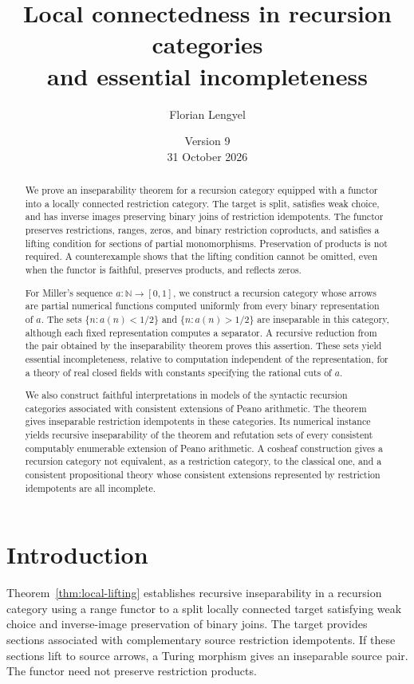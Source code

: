 \documentclass[11pt]{article}
\title{Local connectedness in recursion categories\\
and essential incompleteness}
\author{Florian Lengyel}
\date{Version 9\\31 October 2026}
\newcommand{\N}{\mathbb N}
\begin{document}
\maketitle

\begin{abstract}
We prove an inseparability theorem for a recursion category equipped
with a functor into a locally connected restriction category.
The target is split, satisfies weak choice, and has inverse images
preserving binary joins of restriction idempotents. The functor
preserves restrictions, ranges, zeros, and binary restriction coproducts,
and satisfies a lifting condition for sections of partial monomorphisms.
Preservation of products is not required. A counterexample shows that
the lifting condition cannot be omitted, even when the functor is
faithful, preserves products, and reflects zeros.

For Miller's sequence $a:\N\to[0,1]$, we construct a recursion category
whose arrows are partial numerical functions computed uniformly from
every binary representation of $a$. The sets
$\{n:a(n)<1/2\}$ and $\{n:a(n)>1/2\}$ are inseparable in this category,
although each fixed representation computes a separator. A recursive
reduction from the pair obtained by the inseparability theorem proves
this assertion. These sets yield essential incompleteness, relative
to computation independent of the representation, for a theory of real
closed fields with constants specifying the rational cuts of $a$.

We also construct faithful interpretations in models of the syntactic
recursion categories associated with consistent extensions of Peano
arithmetic. The theorem gives inseparable restriction idempotents in
these categories. Its numerical instance yields recursive inseparability
of the theorem and refutation sets of every consistent computably
enumerable extension of Peano arithmetic. A cosheaf construction gives
a recursion category not equivalent, as a restriction category, to the
classical one, and a consistent propositional theory whose consistent
extensions represented by restriction idempotents are all incomplete.
\end{abstract}

\section{Introduction}

Theorem~\ref{thm:local-lifting} establishes recursive inseparability
in a recursion category using a range functor to a split locally
connected target satisfying weak choice and inverse-image preservation
of binary joins. The target provides sections associated with
complementary source restriction idempotents. If these sections lift
to source arrows, a Turing morphism gives an inseparable source pair.
The functor need not preserve restriction products.
\end{document}

